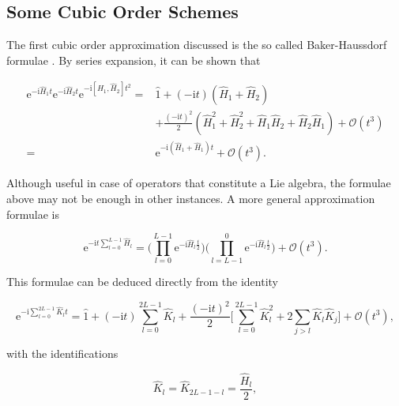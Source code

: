   \subsection{Some Cubic Order Schemes}
  \label{subsec:QubicOrderTrotter}

    The first cubic order approximation discussed is the so called Baker-Haussdorf formulae \cite{Nielsen}. By series expansion, it can be shown that

    \begin{align*}
      \mathrm{e}^{-\mathrm{i}\hat{H}_1t}\mathrm{e}^{-\mathrm{i}\hat{H}_2t}\mathrm{e}^{-\mathrm{i}[\hat{H}_1,\hat{H}_2]t^2} = & \hat{1} + (-\mathrm{i}t) (\hat{H}_1 + \hat{H}_2) \\
      & + \frac{(-\mathrm{i}t)^2}{2}(\hat{H}_1^2 + \hat{H}_2^2 + \hat{H}_1\hat{H}_2 + \hat{H}_2\hat{H}_1) + \mathcal{O}(t^3) \\
      = & \mathrm{e}^{-\mathrm{i}(\hat{H}_1 + \hat{H}_1)t} + \mathcal{O}(t^3).
      \label{eq:Hausdorf1}
    \end{align*}

    Although useful in case of operators that constitute a Lie algebra, the formulae above may not be enough in other instances. A more general approximation formulae is

    \begin{equation}
      \mathrm{e}^{-\mathrm{i}t\sum_{l = 0}^{L-1}\hat{H}_l} = \Bigg(\prod_{l = 0}^{L-1}\mathrm{e}^{-\mathrm{i}\hat{H}_l\frac{t}{2}}\Bigg)\Bigg(\prod_{l = L-1}^{0}\mathrm{e}^{-\mathrm{i}\hat{H}_l\frac{t}{2}}\Bigg) + \mathcal{O}(t^3).
      \label{eq:Suzuki0}
    \end{equation}

    This formulae can be deduced directly from the identity

    \begin{equation}
      \mathrm{e}^{-\mathrm{i}\sum_{l = 0}^{2L-1} \hat{K}_l t} = \hat{1} + (-\mathrm{i}t)\sum_{l = 0}^{2L-1} \hat{K}_l + \frac{(-\mathrm{i}t)^2}{2} \Bigg[\sum_{l = 0}^{2L-1} \hat{K}_l^2 + 2 \sum_{j > l}\hat{K}_l \hat{K}_j\Bigg] + \mathcal{O}(t^3),
      \label{eq:TrotterFormula1}
    \end{equation}

    \noindent with the identifications

    \begin{equation}
      \hat{K}_l = \hat{K}_{2L-1-l} = \frac{\hat{H}_l}{2},
      \label{eq:Identifications}
    \end{equation}

